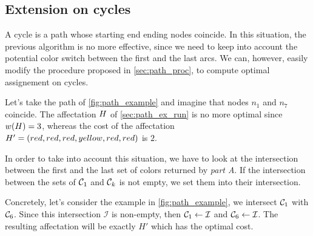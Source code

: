 \subsection{Extension on cycles}

A cycle is a path whose starting end ending nodes coincide.
In this situation, the previous algorithm is no more effective, since we need to keep into account the potential color switch between the first and the last arcs.
We can, however, easily modify the procedure proposed in \cref{sec:path_proc}, to compute optimal assignement on cycles.

Let's take the path of \cref{fig:path_example} and imagine that nodes $n_1$ and $n_7$ coincide.
The affectation $H$ of \cref{sec:path_ex_run} is no more optimal since $w(H) = 3$, whereas the cost of the affectation $H' = (red, red, red, yellow, red, red)$ is $2$.

In order to take into account this situation, we have to look at the intersection between the first and the last set of colors returned by \textit{part A}. If the intersection between the sets of $\mathcal{C}_1$ and $\mathcal{C}_k$ is not empty, we set them into their intersection.

Concretely, let's consider the example in \cref{fig:path_example}, we intersect $\mathcal{C}_1$ with $\mathcal{C}_6$. Since this intersection $\mathcal{I}$ is non-empty, then $\mathcal{C}_1 \gets \mathcal{I}$ and $\mathcal{C}_6 \gets \mathcal{I}$. The resulting affectation will be exactly $H'$ which has the optimal cost.

